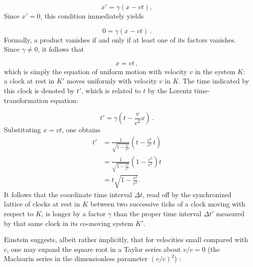 \documentclass[pdflatex]{sn-jnl}
\begin{document}
\begin{equation*}
x'=\gamma(x-vt),
\end{equation*}
%
Since $x'=0$, this condition immediately yields

\begin{equation*}
0=\gamma(x-vt)\,.
\end{equation*}
%
Formally, a product vanishes if and only if at least one of its factors vanishes. Since $\gamma \neq 0$, it follows that

\begin{equation*}
x=vt\,,
\end{equation*}
%
which is simply the equation of uniform motion with velocity $v$ in the system $K$: a clock at rest in $K'$ moves uniformly with velocity $v$ in $K$. The time indicated by this clock is denoted by $t'$, which is related to $t$ by the Lorentz time-transformation equation:

\begin{equation*}
t'=\gamma\!\left(t-\frac{v}{c^{2}}x\right)\,.
\end{equation*}
%
Substituting $x=vt$, one obtains
%
\begin{equation*}
\begin{aligned}
t'
&=\frac{1}{\sqrt{1-\frac{v^{2}}{c^{2}}}}
\left(t-\frac{v^{2}}{c^{2}}\,t\right)\\[6pt]
&=\frac{1}{\sqrt{1-\frac{v^{2}}{c^{2}}}}
\left(1-\frac{v^{2}}{c^{2}}\right)t\\[6pt]
&=t\sqrt{1-\frac{v^{2}}{c^{2}}}.
\end{aligned}
\end{equation*}%
%
It follows that the coordinate time interval $\Delta t$, read off by the synchronized lattice of clocks at rest in $K$ between two successive ticks of a clock moving with respect to $K$, is longer by a factor $\gamma$ than the proper time interval $\Delta t'$ measured by that same clock in its co-moving system $K'$.

Einstein suggests, albeit rather implicitly, that for velocities small compared with $c$, one may expand the square root in a Taylor series about $v/c=0$ (\ie the Maclaurin series in the dimensionless parameter $(v/c)^{2}$)%
%
%
%
:
\end{document}
